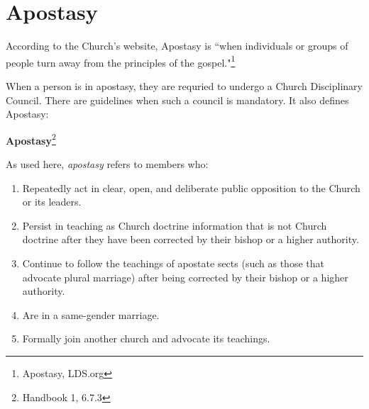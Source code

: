 \chapter{Apostasy}

According to the Church's website, Apostasy is ``when individuals or groups of people
turn away from the principles of the gospel."\footnote{Apostasy, LDS.org}

When a person is in apostasy, they are requried to undergo a Church Disciplinary
Council. There are guidelines when such a council is mandatory. It also defines
Apostasy:

\begin{displayquote}
\textbf{Apostasy}\footnote{Handbook 1, 6.7.3}

As used here, \textit{apostasy} refers to members who:

\begin{enumerate}
\item Repeatedly act in clear, open, and deliberate public opposition to the Church 
  or its leaders.

\item Persist in teaching as Church doctrine information that is not Church doctrine 
  after they have been corrected by their bishop or a higher authority.

\item Continue to follow the teachings of apostate sects (such as those that advocate 
  plural marriage) after being corrected by their bishop or a higher authority.

\item Are in a same-gender marriage.

\item Formally join another church and advocate its teachings.
\end{enumerate}
\end{displayquote}